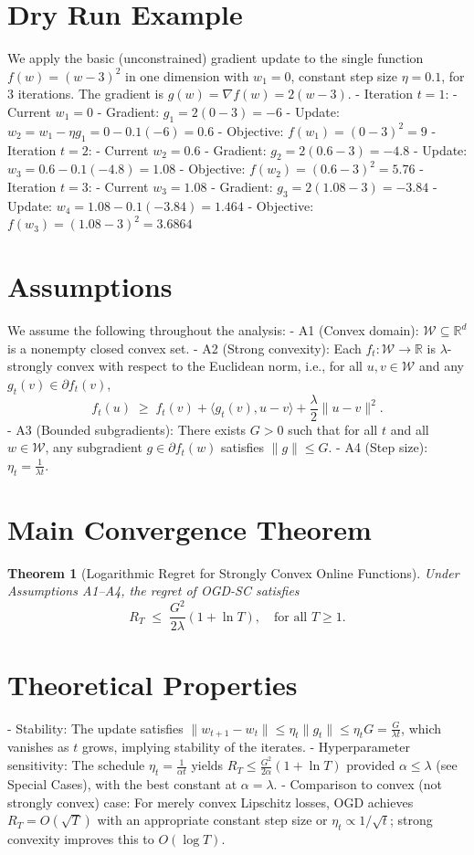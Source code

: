 \documentclass[12pt]{article}
\newtheorem{theorem}{Theorem}
\begin{document}
\section*{Dry Run Example}
We apply the basic (unconstrained) gradient update to the single function $f(w) = (w-3)^2$ in one dimension with $w_1=0$, constant step size $\eta=0.1$, for $3$ iterations. The gradient is $g(w)=\nabla f(w)=2(w-3)$.
- Iteration $t=1$:
  - Current $w_1=0$
  - Gradient: $g_1 = 2(0-3) = -6$
  - Update: $w_2 = w_1 - \eta g_1 = 0 - 0.1(-6) = 0.6$
  - Objective: $f(w_1) = (0-3)^2 = 9$
- Iteration $t=2$:
  - Current $w_2=0.6$
  - Gradient: $g_2 = 2(0.6-3) = -4.8$
  - Update: $w_3 = 0.6 - 0.1(-4.8) = 1.08$
  - Objective: $f(w_2) = (0.6-3)^2 = 5.76$
- Iteration $t=3$:
  - Current $w_3=1.08$
  - Gradient: $g_3 = 2(1.08-3) = -3.84$
  - Update: $w_4 = 1.08 - 0.1(-3.84) = 1.464$
  - Objective: $f(w_3) = (1.08-3)^2 = 3.6864$

\section*{Assumptions}
We assume the following throughout the analysis:
- A1 (Convex domain): $\mathcal{W}\subseteq \mathbb{R}^d$ is a nonempty closed convex set.
- A2 (Strong convexity): Each $f_t:\mathcal{W}\to\mathbb{R}$ is $\lambda$-strongly convex with respect to the Euclidean norm, i.e., for all $u,v\in \mathcal{W}$ and any $g_t(v)\in \partial f_t(v)$,
\[
f_t(u) \;\ge\; f_t(v) + \langle g_t(v), u-v\rangle + \frac{\lambda}{2}\|u-v\|^2.
\]
- A3 (Bounded subgradients): There exists $G>0$ such that for all $t$ and all $w\in \mathcal{W}$, any subgradient $g\in \partial f_t(w)$ satisfies $\|g\|\le G$.
- A4 (Step size): $\eta_t = \frac{1}{\lambda t}$.

\section*{Main Convergence Theorem}
\begin{theorem}[Logarithmic Regret for Strongly Convex Online Functions]
Under Assumptions A1--A4, the regret of OGD-SC satisfies
\[
R_T \;\le\; \frac{G^2}{2\lambda}\left(1 + \ln T\right), \quad \text{for all } T\ge 1.
\]
\end{theorem}

\section*{Theoretical Properties}
- Stability: The update satisfies $\|w_{t+1}-w_t\|\le \eta_t \|g_t\|\le \eta_t G=\frac{G}{\lambda t}$, which vanishes as $t$ grows, implying stability of the iterates.
- Hyperparameter sensitivity: The schedule $\eta_t=\frac{1}{\alpha t}$ yields $R_T\le \frac{G^2}{2\alpha}(1+\ln T)$ provided $\alpha\le \lambda$ (see Special Cases), with the best constant at $\alpha=\lambda$.
- Comparison to convex (not strongly convex) case: For merely convex Lipschitz losses, OGD achieves $R_T=O(\sqrt{T})$ with an appropriate constant step size or $\eta_t\propto 1/\sqrt{t}$; strong convexity improves this to $O(\log T)$.
\end{document}
